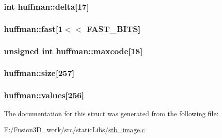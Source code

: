 \subsubsection[{delta}]{\setlength{\rightskip}{0pt plus 5cm}int huffman\+::delta\mbox{[}17\mbox{]}}\label{structhuffman_a04255e3e1c6de74d36a08a1aa4e9537d}
\hypertarget{structhuffman_a9dbb29a8ed724a32f502d9595510ddc2}{}
\subsubsection[{fast}]{ huffman\+::fast\mbox{[}1$<$$<$ {\bf F\+A\+S\+T\+\_\+\+B\+I\+T\+S}\mbox{]}}\label{structhuffman_a9dbb29a8ed724a32f502d9595510ddc2}
\hypertarget{structhuffman_aeb78aca6c7377faaad8123566d54fc98}{}
\subsubsection[{maxcode}]{\setlength{\rightskip}{0pt plus 5cm}unsigned int huffman\+::maxcode\mbox{[}18\mbox{]}}\label{structhuffman_aeb78aca6c7377faaad8123566d54fc98}
\hypertarget{structhuffman_afdb0fbcf25aec42ba30b0d0e2453a057}{}
\subsubsection[{size}]{ huffman\+::size\mbox{[}257\mbox{]}}\label{structhuffman_afdb0fbcf25aec42ba30b0d0e2453a057}
\hypertarget{structhuffman_a313d78cf23f40b314c25681ff2a6224b}{}
\subsubsection[{values}]{ huffman\+::values\mbox{[}256\mbox{]}}\label{structhuffman_a313d78cf23f40b314c25681ff2a6224b}


The documentation for this struct was generated from the following file\+:\begin{DoxyCompactItemize}
\item 
F\+:/\+Fusion3\+D\+\_\+work/src/static\+Libs/\hyperlink{stb__image_8c}{stb\+\_\+image.\+c}\end{DoxyCompactItemize}
